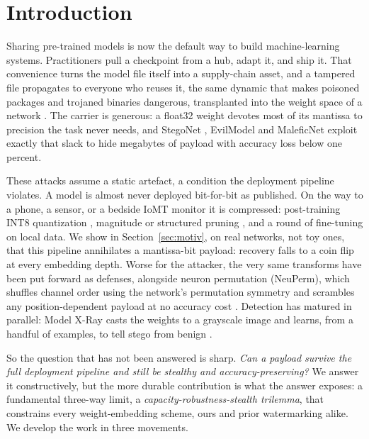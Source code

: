 \documentclass[10pt,journal]{IEEEtran}
\theoremstyle{remark}
\begin{document}
\section{Introduction}\label{sec:intro}
Sharing pre-trained models is now the default way to build machine-learning systems.
Practitioners pull a checkpoint from a hub, adapt it, and ship it. That convenience
turns the model file itself into a supply-chain asset, and a tampered file propagates
to everyone who reuses it, the same dynamic that makes poisoned packages and
trojaned binaries dangerous, transplanted into the weight space of a network
\cite{gu2017badnets,liu2018trojaning,digregorio2026insecurity}. The carrier is generous: a float32
weight devotes most of its mantissa to precision the task never needs, and StegoNet
\cite{liu2020stegonet}, EvilModel \cite{wang2021evilmodel,wang2022evilmodel2} and
MaleficNet \cite{hitaj2022maleficnet,hitaj2025trust} exploit exactly that slack to
hide megabytes of payload with accuracy loss below one percent.

These attacks assume a static artefact, a condition the deployment pipeline violates. A
model is almost never deployed bit-for-bit as published. On the way to a phone, a sensor, or a bedside IoMT
monitor it is compressed: post-training INT8 quantization \cite{jacob2018quantization},
magnitude or structured pruning \cite{han2015learning,han2016deepcompression}, and a
round of fine-tuning on local data. We show in Section~\ref{sec:motiv}, on real
networks, not toy ones, that this pipeline annihilates a mantissa-bit payload:
recovery falls to a coin flip at every embedding depth. Worse for the attacker, the
very same transforms have been put forward as defenses, alongside neuron permutation
(NeuPerm), which shuffles channel order using the network's permutation symmetry and
scrambles any position-dependent payload at no accuracy cost
\cite{gilkarov2025neuperm}. Detection has matured in parallel: Model X-Ray casts the
weights to a grayscale image and learns, from a handful of examples, to tell stego
from benign \cite{gilkarov2026modelxray}.

So the question that has not been answered is sharp. \emph{Can a payload survive the
full deployment pipeline and still be stealthy and accuracy-preserving?} We answer it
constructively, but the more durable contribution is what the answer exposes: a
fundamental three-way limit, a \emph{capacity-robustness-stealth trilemma}, that
constrains every weight-embedding scheme, ours and prior watermarking alike. We develop
the work in three movements.
\end{document}
